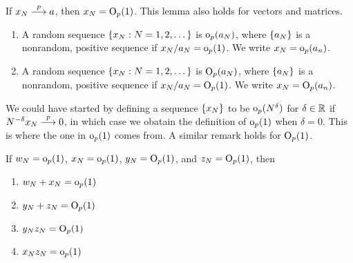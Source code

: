 \documentclass[11pt, oneside, a4paper, article]{article}
\numberwithin{equation}{section}
\begin{document}
\begin{lem}
If $x_{N}  \overset{p}{\longrightarrow}  a$, then $x_{N} = \text{O}_{p}(1)$.
This lemma also holds for vectors and matrices.
\end{lem}

\vspace{1 em}
\begin{defn}
\item
\begin{enumerate}
\item 
A random sequence $\{x_{N} : N = 1, 2, \dots\}$ is $\text{o}_{p}(a_{N})$, where $\{a_{N}\}$ is a nonrandom, positive sequence if $x_{N}/a_{N} = \text{o}_{p}(1)$.
We write $x_{N} = \text{o}_{p}(a_{n})$.

\item 
A random sequence $\{x_{N} : N = 1, 2, \dots\}$ is $\text{O}_{p}(a_{N})$, where $\{a_{N}\}$ is a nonrandom, positive sequence if $x_{N}/a_{N} = \text{O}_{p}(1)$.
We write $x_{N} = \text{O}_{p}(a_{n})$.
\end{enumerate}
\end{defn}

\begin{remark}
We could have started by defining a sequence $\{x_{N}\}$ to be $\text{o}_{p}(N^{\delta})$ for $\delta \in \mathbb{R}$ if $N^{-\delta} x_{N}  \overset{p}{\longrightarrow}  0$, in which case we obatain the definition of $\text{o}_{p}(1)$ when $\delta = 0$.
This is where the one in $\text{o}_{p}(1)$ comes from.
A similar remark holds for $\text{O}_{p}(1)$.
\end{remark}

\begin{lem}
	If $w_{N} = \text{o}_{p}(1)$, $x_{N} = \text{o}_{p}(1)$, $y_{N} = \text{O}_{p}(1)$, and $z_{N} = \text{O}_{p}(1)$, then

\vspace{-1 ex}
\begin{enumerate}[noitemsep]
\item $w_{N} + x_{N} = \text{o}_{p}(1)$

\item $y_{N} + z_{N} = \text{O}_{p}(1)$

\item $y_{N} z_{N} = \text{O}_{p}(1)$

\item $x_{N} z_{N} = \text{o}_{p}(1)$
\end{enumerate}

\end{lem}
\end{document}

